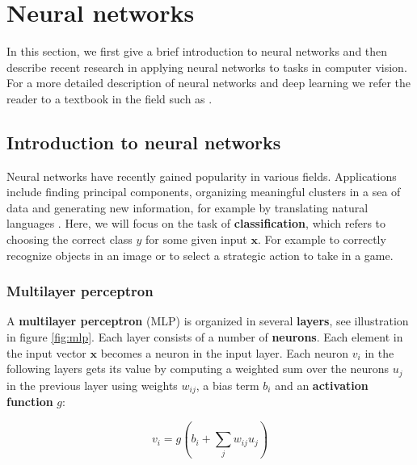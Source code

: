 

\section{Neural networks}
\label{sec:networks}
In this section, we first give a brief introduction to neural networks and then describe recent research in applying neural networks to tasks in computer vision.
For a more detailed description of neural networks and deep learning we refer the reader to a textbook in the field such as \cite{GoodfellowBook}.

\subsection{Introduction to neural networks}

Neural networks have recently gained popularity in various fields.
Applications include finding principal components, organizing meaningful clusters in a sea of data and generating new information, for example by translating natural languages \cite{machine_translation_attention}. Here, we will focus on the task of \textbf{classification}, which refers to choosing the correct class $y$ for some given input $\mathbf{x}$. For example to correctly recognize objects in an image or to select a strategic action to take in a game.

\subsubsection{Multilayer perceptron}



A \textbf{multilayer perceptron} (MLP) is organized in several \textbf{layers}, see illustration in figure \ref{fig:mlp}. Each layer consists of a number of \textbf{neurons}.
Each element in the input vector $\mathbf{x}$ becomes a neuron in the input layer. Each neuron $v_i$ in the following layers gets its value by computing a weighted sum over the neurons $u_j$ in the previous layer using weights  $w_{ij}$, a bias term $b_i$ and an \textbf{activation function} $g$:

\[
v_i = g\left( b_i + \sum_j w_{ij} u_j \right)
\]

